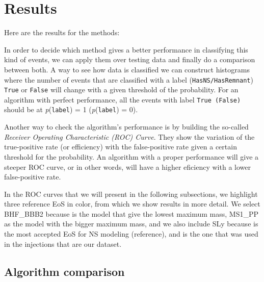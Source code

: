 \section{Results\label{results}}



Here are the results for the methods:




In order to decide which method gives a better performance in classifying this kind of events, we can apply them over testing data and finally do a comparison between both. A way to see how data is classified we can construct histograms where the number of events that are classified with a label (\texttt{HasNS/HasRemnant}) \texttt{True} or \texttt{False} will change with a given threshold of the probability. For an algorithm with perfect performance, all the events with label \texttt{True (False)} should be at \textit{p}(\texttt{label}) = 1 (\textit{p}(\texttt{label}) = 0).

Another way to check the algorithm's performance is by building the so-called \textit{Receiver Operating Characteristic (ROC) Curve}. They show the variation of the true-positive rate (or efficiency) with the false-positive rate given a certain threshold for the probability. An algorithm with a proper performance will give a steeper ROC curve, or in other words, will have a higher eficiency with a lower false-positive rate.  


In the ROC curves that we will present in the following subsections, we highlight three reference EoS in color, from which we show results in more detail. We select BHF\_BBB2 because is the model that give the lowest maximum mass, MS1\_PP as the model with the bigger maximum mass, and we also include SLy because is the most accepted EoS for NS modeling (reference), and is the one that was used in the injections that are our dataset.


\subsection{Algorithm comparison}



